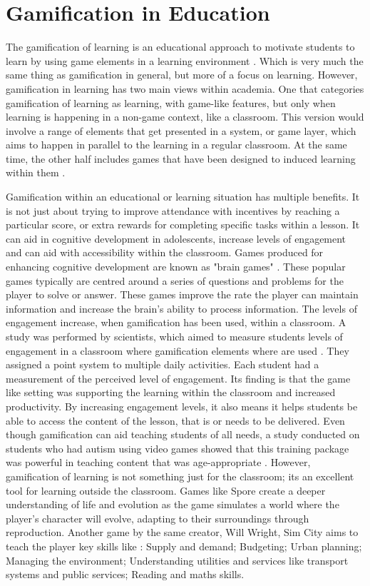 	\section{Gamification in Education}
		\label{sec:gamification_edu}
		The gamification of learning is an educational approach to motivate students to learn by using game elements in a learning environment \cite{gamelearning}. Which is very much the same thing as gamification in general, but more of a focus on learning. However, gamification in learning has two main views within academia. One that categories gamification of learning as learning, with game-like features, but only when learning is happening in a non-game context, like a classroom. This version would involve a range of elements that get presented in a system, or game layer, which aims to happen in parallel to the learning in a regular classroom. At the same time, the other half includes games that have been designed to induced learning within them \cite{gamelearning}.

		Gamification within an educational or learning situation has multiple benefits. It is not just about trying to improve attendance with incentives by reaching a particular score, or extra rewards for completing specific tasks within a lesson. It can aid in cognitive development in adolescents, increase levels of engagement and can aid with accessibility within the classroom. Games produced for enhancing cognitive development are known as "brain games" \cite{5benefits}. These popular games typically are centred around a series of questions and problems for the player to solve or answer. These games improve the rate the player can maintain information and increase the brain's ability to process information. The levels of engagement increase, when gamification has been used, within a classroom. A study was performed by scientists, which aimed to measure students levels of engagement in a classroom where gamification elements where are used \cite{eduengage}. They assigned a point system to multiple daily activities. Each student had a measurement of the perceived level of engagement. Its finding is that the game like setting was supporting the learning within the classroom and increased productivity. By increasing engagement levels, it also means it helps students be able to access the content of the lesson, that is or needs to be delivered. Even though gamification can aid teaching students of all needs, a study conducted on students who had autism using video games showed that this training package was powerful in teaching content that was age-appropriate \cite{autismedu}. However, gamification of learning is not something just for the classroom; its an excellent tool for learning outside the classroom. Games like Spore create a deeper understanding of life and evolution as the game simulates a world where the player's character will evolve, adapting to their surroundings through reproduction. Another game by the same creator, Will Wright, Sim City aims to teach the player key skills like \cite{simfact}: Supply and demand; Budgeting; Urban planning; Managing the environment; Understanding utilities and services like transport systems and public services; Reading and maths skills.

